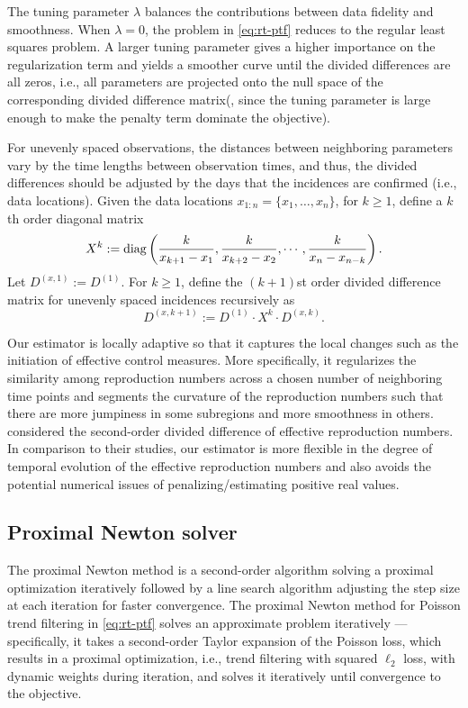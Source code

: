 The tuning parameter $\lambda$ balances the contributions between data fidelity and smoothness. When $\lambda=0$, the problem in \eqref{eq:rt-ptf} reduces to the regular least squares problem. A larger tuning parameter gives a higher importance on the regularization term and yields a smoother curve until the divided differences are all zeros, i.e., all parameters are projected onto the null space of the corresponding divided difference matrix(, since the tuning parameter is large enough to make the penalty term dominate the objective). 

For unevenly spaced observations, the distances between neighboring parameters vary by the time lengths between observation times, and thus, the divided differences should be adjusted by the days that the incidences are confirmed (i.e., data locations). Given the data locations $x_{1:n} = \{x_1,\dots,x_n\}$, for $k \geq 1$, define a $k$th order diagonal matrix $$X^k := \operatorname*{diag} \left(\frac{k}{x_{k+1} - x_1}, \frac{k}{x_{k+2} - x_2}, \cdots, \frac{k}{x_n - x_{n-k}} \right).$$ Let $D^{(x,1)} := D^{(1)}$. For $k\geq 1$, define the $(k+1)$st order divided difference matrix for unevenly spaced incidences recursively as $$D^{(x,k+1)} := D^{(1)}\cdot X^k \cdot D^{(x,k)}.$$ 


Our estimator is locally adaptive so that it captures the local changes such as the initiation of effective control measures. More specifically, it regularizes the similarity among reproduction numbers across a chosen number of neighboring time points and segments the curvature of the reproduction numbers such that there are more jumpiness in some subregions and more smoothness in others. 
\cite{abry2020spatial,pascal2022nonsmooth} considered the second-order divided difference of effective reproduction numbers. In comparison to their studies, our estimator is more flexible in the degree of temporal evolution of the effective reproduction numbers and also avoids the potential numerical issues of penalizing/estimating positive real values. 

\subsection{Proximal Newton solver} %

The proximal Newton method is a second-order algorithm solving a proximal optimization iteratively followed by a line search algorithm adjusting the step size at each iteration for faster convergence. The proximal Newton method for Poisson trend filtering in \eqref{eq:rt-ptf} solves an approximate problem iteratively --- specifically, it takes a second-order Taylor expansion of the Poisson loss, which results in a proximal optimization, i.e., trend filtering with squared $\ell_2$ loss, with dynamic weights during iteration, and solves it iteratively until convergence to the objective. 

